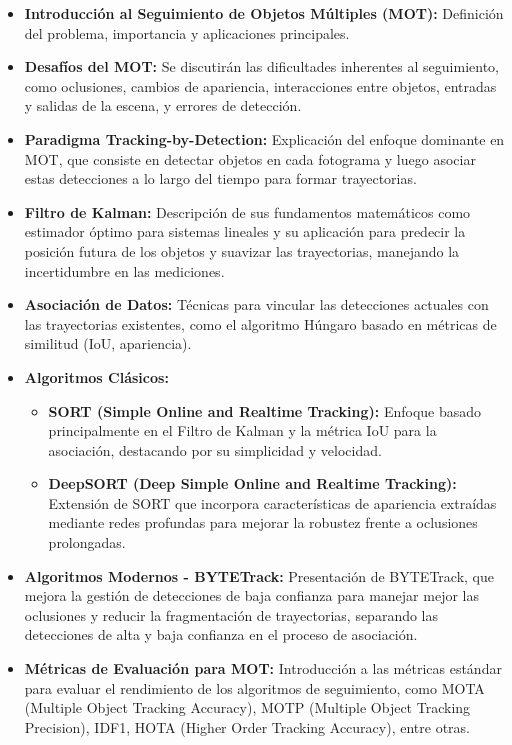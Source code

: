 \documentclass[11pt,spanish,listoffigures,listoftables]{tfgetsinf}
\begin{document}
\begin{itemize}
   \item \textbf{Introducción al Seguimiento de Objetos Múltiples (MOT):} Definición del problema, importancia y aplicaciones principales.
   \item \textbf{Desafíos del MOT:} Se discutirán las dificultades inherentes al seguimiento, como oclusiones, cambios de apariencia, interacciones entre objetos, entradas y salidas de la escena, y errores de detección.
   \item \textbf{Paradigma Tracking-by-Detection:} Explicación del enfoque dominante en MOT, que consiste en detectar objetos en cada fotograma y luego asociar estas detecciones a lo largo del tiempo para formar trayectorias.
   \item \textbf{Filtro de Kalman:} Descripción de sus fundamentos matemáticos como estimador óptimo para sistemas lineales y su aplicación para predecir la posición futura de los objetos y suavizar las trayectorias, manejando la incertidumbre en las mediciones.
   \item \textbf{Asociación de Datos:} Técnicas para vincular las detecciones actuales con las trayectorias existentes, como el algoritmo Húngaro basado en métricas de similitud (IoU, apariencia).
   \item \textbf{Algoritmos Clásicos:}
      \begin{itemize}
         \item \textbf{SORT (Simple Online and Realtime Tracking):} Enfoque basado principalmente en el Filtro de Kalman y la métrica IoU para la asociación, destacando por su simplicidad y velocidad.
         \item \textbf{DeepSORT (Deep Simple Online and Realtime Tracking):} Extensión de SORT que incorpora características de apariencia extraídas mediante redes profundas para mejorar la robustez frente a oclusiones prolongadas.
      \end{itemize}
   \item \textbf{Algoritmos Modernos - BYTETrack:} Presentación de BYTETrack, que mejora la gestión de detecciones de baja confianza para manejar mejor las oclusiones y reducir la fragmentación de trayectorias, separando las detecciones de alta y baja confianza en el proceso de asociación.
   \item \textbf{Métricas de Evaluación para MOT:} Introducción a las métricas estándar para evaluar el rendimiento de los algoritmos de seguimiento, como MOTA (Multiple Object Tracking Accuracy), MOTP (Multiple Object Tracking Precision), IDF1, HOTA (Higher Order Tracking Accuracy), entre otras.
\end{itemize}
\end{document}
